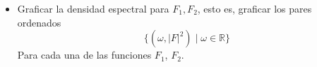 \documentclass[12pt,a4paper]{report}
\begin{document}
\begin{enumerate}[label=\alph*),left=0pt]
\begin {itemize}[left=0pt]
\begin{figure}[h!]
\begin{minipage}{0.45\textwidth}
            \caption{Espectro de frecuencia en módulo para $x_2$}
            \label{fig:imagen2}
          \end{minipage}
        \end{figure}

        \textbf{Reflexionar:} ¿El espectro de frecuencia en módulo es discreto o continuo? ¿El gráfico admite una 
        simetría par, impar o ninguna?\\

        Para ambas señales el espectro de frecuencia en modulo es una señal de tiempo continuo, y admiten simtria par.\\

      \item Graficar la densidad espectral para $F_1, F_2$, esto es, graficar los pares ordenados
        $$\{(\omega, |F|^2) \mid \omega \in \mathbb{R}\}$$
        Para cada una de las funciones $F_1$, $F_2$.\\


\end{itemize}
\end{enumerate}
\end{document}
